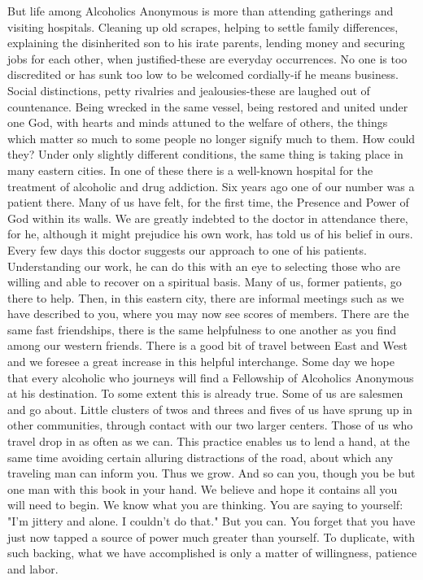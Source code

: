 \begin{biblechapter}
But life among Alcoholics Anonymous is more than attending gatherings and visiting hospitals.  Cleaning up old scrapes, helping to settle family differences, explaining the disinherited son to his irate parents, lending money and securing jobs for each other, when justified-these are everyday occurrences.  No one is too discredited or has sunk too low to be welcomed cordially-if he means business.  Social distinctions, petty rivalries and jealousies-these are laughed out of countenance.  Being wrecked in the same vessel, being restored and united under one God, with hearts and minds attuned to the welfare of others, the things which matter so much to some people no longer signify much to them.  How could they?
Under only slightly different conditions, the same thing is taking place in many eastern cities.  In one of these there is a well-known hospital for the treatment of alcoholic and drug addiction.  Six years ago one of our number was a patient there.  Many of us have felt, for the first time, the Presence and Power of God within its walls.  We are greatly indebted to the doctor in attendance there, for he, although it might prejudice his own work, has told us of his belief in ours.
Every few days this doctor suggests our approach to one of his patients.  Understanding our work, he can do this with an eye to selecting those who are willing and able to recover on a spiritual basis.  Many of us, former patients, go there to help.  Then, in this eastern city, there are informal meetings such as we have described to you, where you may now see scores of members.  There are the same fast friendships, there is the same helpfulness to one another as you find among our western friends.  There is a good bit of travel between East and West and we foresee a great increase in this helpful interchange.
Some day we hope that every alcoholic who journeys will find a Fellowship of Alcoholics Anonymous at his destination.  To some extent this is already true.  Some of us are salesmen and go about.  Little clusters of twos and threes and fives of us have sprung up in other communities, through contact with our two larger centers.  Those of us who travel drop in as often as we can.  This practice enables us to lend a hand, at the same time avoiding certain alluring distractions of the road, about which any traveling man can inform you.
Thus we grow.  And so can you, though you be but one man with this book in your hand.  We believe and hope it contains all you will need to begin.
We know what you are thinking.  You are saying to yourself: "I'm jittery and alone.  I couldn't do that."  But you can.  You forget that you have just now tapped a source of power much greater than yourself.  To duplicate, with such backing, what we have accomplished is only a matter of willingness, patience and labor.

\end{biblechapter}
